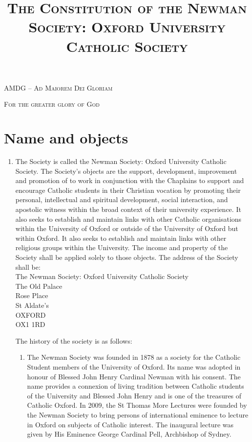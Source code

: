 \documentclass[11pt]{article}
\date{}
\title{\scshape{The Constitution of the Newman Society: Oxford University Catholic Society}}
\begin{document}
\renewcommand{\theenumi}{\Alph{enumi}}
\renewcommand{\theenumii}{(\roman{enumii})}
\setcounter{tocdepth}{1}
\maketitle
\centerline{\scshape{AMDG -- Ad Maiorem Dei Gloriam}}

\centerline{\scshape{For the greater glory of God}}
\tableofcontents
{}
\section{Name and objects}
\begin{enumerate}
\item The Society is called the Newman Society: Oxford University Catholic Society. The Society's objects are the support, development, improvement and promotion of to work in conjunction with the Chaplains to support and encourage Catholic students in their Christian vocation by promoting their personal, intellectual and spiritual development, social interaction, and apostolic witness within the broad context of their university experience.  It also seeks to establish and maintain links with other Catholic organisations within the University of Oxford or outside of the University of Oxford but within Oxford. It also seeks to establish and maintain links with other religious groups within the University. The income and property of the Society shall be applied solely to those objects.  The address of the Society shall be: \\
The Newman Society: Oxford University Catholic Society\\
The Old Palace\\
Rose Place\\
St Aldate's\\
OXFORD\\
OX1 1RD

The history of the society is as follows:
\begin{enumerate}
\item The Newman Society was founded in 1878 as a society for the Catholic Student members of the University of Oxford.  Its name was adopted in honour of Blessed John Henry Cardinal Newman with his consent. The name provides a connexion of living tradition between Catholic students of the University and Blessed John Henry and is one of the treasures of Catholic Oxford. In 2009, the St Thomas More Lectures were founded by the Newman Society to bring persons of international eminence to lecture in Oxford on subjects of Catholic interest. The inaugural lecture was given by His Eminence George Cardinal Pell, Archbishop of Sydney.


\end{enumerate}
\end{enumerate}
\end{document}
